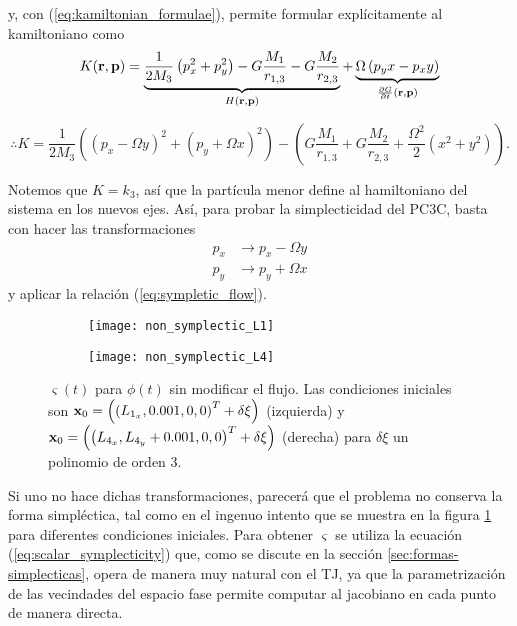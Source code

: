 y, con (\ref{eq:kamiltonian_formulae}), permite formular explícitamente al kamiltoniano como
\begin{equation*}
 K(\mathbf{r}, \mathbf{p}) = \underbrace{ \frac{1}{2M_3}\left( p_x^2 + p_y^2 \right) - G \frac{M_1}{r_{1,3}} - G \frac{M_2}{r_{2,3}}}_{H(\mathbf{r}, \mathbf{p}) } + \underbrace{\Omega\left( p_y x - p_x y \right) }_{\frac{\partial G}{\partial t}(\mathbf{r}, \mathbf{p})}
\end{equation*}

\begin{equation}
 \therefore K = \frac{1}{2M_3} \left( (p_x - \Omega y)^2 + (p_y + \Omega x)^2 \right) - \left(G \frac{M_1}{r_{1,3}} + G \frac{M_2}{r_{2,3}} + \frac{\Omega^2}{2}\left( x^2 + y^2 \right) \right).
 \label{eq:kamiltonian}
\end{equation}

Notemos que $K = k_3$, así que la partícula menor define al hamiltoniano del sistema en los nuevos ejes. Así, para probar la simplecticidad del PC3C, basta con hacer las transformaciones 
\begin{align}
p_x &\to p_x - \Omega y \\
p_y &\to p_y + \Omega x
\label{eq:momentum_transformation}
\end{align} 
y aplicar la relación (\ref{eq:sympletic_flow}).

\begin{figure}[h!]
\centering
\begin{subfigure}{0.49\textwidth}
	\centering
	\texttt{[image: non\_symplectic\_L1]}
\end{subfigure}
%
\begin{subfigure}{0.49\textwidth}
	\centering
	\texttt{[image: non\_symplectic\_L4]}
\end{subfigure}
\caption{ $\varsigma(t)$ para $\phi(t)$ sin modificar el flujo. Las condiciones iniciales son $\mathbf{x}_0 = \left( \left( L_{1_x}, 0.001, 0, 0 \right)^T + \delta \xi \right) $ (izquierda) y $ \mathbf{x}_0 = \left( \left( L_{4_x}, L_{4_y} + 0.001, 0, 0 \right)^T + \delta \xi \right) $ (derecha) para $\delta \xi$ un polinomio de orden $3$.}
\label{fig:non_symplectic_L4_L1}
\end{figure}

Si uno no hace dichas transformaciones, parecerá que el problema no conserva la forma simpléctica, tal como en el ingenuo intento que se muestra en la figura \ref{fig:non_symplectic_L4_L1} para diferentes condiciones iniciales. Para obtener $\varsigma$ se utiliza la ecuación (\ref{eq:scalar_symplecticity}) que, como se discute en la sección \ref{sec:formas-simplecticas}, opera de manera muy natural con el TJ, ya que la parametrización de las vecindades del espacio fase permite computar al jacobiano en cada punto de manera directa.

